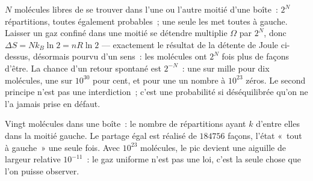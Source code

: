 \begin{example}\label{ex:b1:second-law-entropy:count}
$N$ molécules libres de se trouver dans l'une ou l'autre moitié d'une
boîte~: $2^N$ répartitions, toutes également probables~; une seule les met
toutes à gauche. Laisser un gaz confiné dans une moitié se détendre
multiplie $\Omega$ par $2^N$, donc $\Delta S =
Nk_B\ln2 = nR\ln2$ --- exactement le résultat de la détente de Joule
ci-dessus, désormais pourvu d'un sens~: les molécules ont $2^N$ fois plus de
façons d'être. La chance d'un retour spontané est $2^{-N}$~: une sur mille
pour dix molécules, une sur $10^{30}$ pour cent, et pour une  un nombre
à $10^{23}$ zéros. Le second principe n'est pas une interdiction~; c'est
une probabilité si déséquilibrée qu'on ne l'a jamais prise en défaut.
\end{example}

\begin{omfigure}

{\small Vingt molécules dans une boîte~: le nombre de répartitions ayant
$k$ d'entre elles dans la moitié gauche. Le partage égal est réalisé de
$184756$ façons, l'état «~tout à gauche~» une seule fois. Avec $10^{23}$
molécules, le pic devient une aiguille de largeur relative $10^{-11}$~: le
gaz uniforme n'est pas une loi, c'est la seule chose que l'on puisse observer.}
\end{omfigure}

